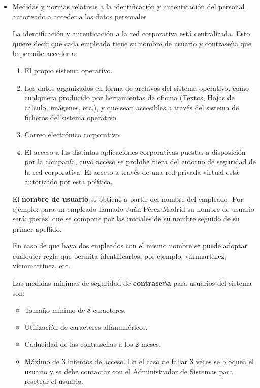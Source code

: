 \documentclass[a4paper,11pt,bibtotoc,noliststotoc]{scrbook}
\begin{document}
\begin{itemize}
\item Medidas y normas relativas a la identificación y autenticación del personal autorizado a acceder a los datos personales

La identificación y autenticación a la red corporativa está centralizada. Esto quiere decir que cada empleado tiene su nombre de usuario y contraseña que le permite acceder a:

\begin{enumerate}
\item El propio sistema operativo.

\item Los datos organizados en forma de archivos del sistema operativo, como cualquiera producido por herramientas de oficina (Textos, Hojas de cálculo, imágenes, etc.), y que sean accesibles a través del sistema de ficheros del sistema operativo.

\item Correo electrónico corporativo.

\item El acceso a las distintas aplicaciones corporativas puestas a disposición por la companía, cuyo acceso se prohíbe fuera del entorno de seguridad de la red corporativa. El acceso a través de una red privada virtual está autorizado por esta política.
\end{enumerate}

El \textbf{nombre de usuario} se obtiene a partir del nombre del empleado. Por ejemplo: para un empleado llamado Juán Pérez Madrid su nombre de usuario será: jperez, que se compone por las iniciales de su nombre seguido de su primer apellido.

En caso de que haya dos empleados con el mismo nombre se puede adoptar cualquier regla que permita identificarlos, por ejemplo: vimmartinez, vicmmartinez, etc.

Las medidas mínimas de seguridad de \textbf{contraseña} para usuarios del sistema son:
\begin{itemize}
	\item Tamaño mínimo de 8 caracteres.
	\item Utilización de caracteres alfanuméricos.
	\item Caducidad de las contraseñas a los 2 meses.
	\item Máximo de 3 intentos de acceso. En el caso de fallar 3 veces se bloquea el usuario y se debe contactar con el Administrador de Sistemas para resetear el usuario.
\end{itemize}



\end{itemize}
\end{document}
